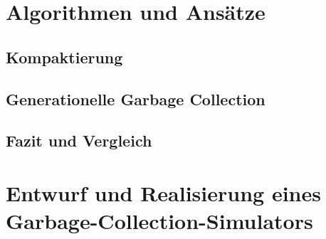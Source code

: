 
\listfiles


\listoftodos



\cleardoublepage

\setcounter{page}{1}
\pagestyle{maincontentstyle}


\part{Algorithmen und Ansätze}


\chapter{Kompaktierung}		%
\chapter{Generationelle Garbage Collection}	%
\chapter{Fazit und Vergleich}		%

\part{Entwurf und Realisierung eines Garbage-Collection-Simulators}

\cleardoublepage






